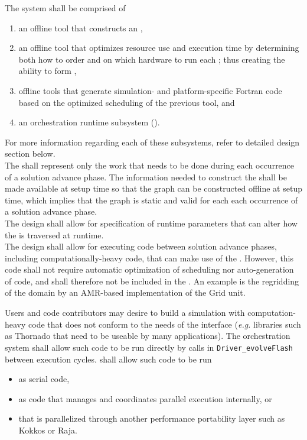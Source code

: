 \documentclass{article}
\begin{document}
\begin{req}
The system shall be comprised of
\begin{enumerate}
\item{an offline tool that constructs an \AKG,}
\item{an offline tool that optimizes resource use and execution time by
determining both how to order \taskroutines and on which hardware to run each
\taskroutine; thus creating the ability to form \taskcodebundles,}
\item{offline tools that generate simulation- and platform-specific Fortran code
based on the optimized scheduling of the previous tool, and}
\item{an orchestration runtime subsystem (\shortOR).}
\end{enumerate}
\end{req}
For more information regarding each of these subsystems,
refer to detailed design section below.\\

The \spelledoutAKG shall represent only the work that needs to be done
during each occurrence of a solution advance phase. %
The information needed to construct the \AKG shall
be made available at setup time so that the graph can be constructed offline at
setup time, which implies that the graph is static and valid for each
each occurrence of a solution advance phase.\\

The design shall allow for specification of runtime parameters that can alter
how the \AKG is traversed at runtime.\\

The design shall allow for executing code between solution advance phases, including
computationally-heavy code, that can make use of the \OR.
However, this code shall not require automatic optimization of scheduling nor
auto-generation of code, and shall therefore not be included in the \AKG.
  An example is the regridding of the domain by an AMR-based
implementation of the Grid unit.\\

\begin{req}
\label{req:NonORCodeInDriverEvolveFlash}
Users and code contributors may desire to build a simulation with
computation-heavy code that does not conform to the needs
of the \OR interface (\textit{e.g.} libraries such as
Thornado that need to be useable by many applications).  The orchestration
system shall allow such code to be run directly by calls in
\texttt{Driver\_evolveFlash} between \OR execution cycles.
\FlashOfTheFuture shall allow such code to be run
\begin{itemize}
\item{as serial code,}
\item{as code that manages and coordinates parallel execution internally, or}
\item{that is parallelized through another performance portability layer such as
Kokkos or Raja.}
\end{itemize}
\end{req}
\end{document}
